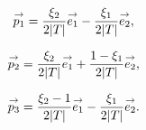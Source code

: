     \begin{minipage}{\textwidth}
      \begin{minipage}{0.329\textwidth}
          \begin{center}
            \begin{tikzpicture}[scale=1]
              
            \end{tikzpicture}
          \end{center}
          \begin{equation*}
            \vect{p_1}=\frac{\xi_2}{2|T|}\vect{e_1}-\frac{\xi_1}{2|T|}\vect{e_2},
          \end{equation*}
      \end{minipage}
      \begin{minipage}{0.329\textwidth}
          \begin{center}
            \begin{tikzpicture}[scale=1]
              
            \end{tikzpicture}
             \begin{equation*}
              \vect{p_2}= \frac{\xi_2}{2|T|}\vect{e_1} + \frac{1-\xi_1}{2|T|}\vect{e_2},
            \end{equation*}
          \end{center}
      \end{minipage}
      \begin{minipage}{0.329\textwidth}
          \begin{center}
            \begin{tikzpicture}[scale=1]
              
            \end{tikzpicture}
            \begin{equation*}
              \vect{p_3}= \frac{\xi_2-1}{2|T|}\vect{e_1} - \frac{\xi_1}{2|T|}\vect{e_2}.
            \end{equation*}
          \end{center}
      \end{minipage}
      \label{fig:form_int:fon_base:p}
    \end{minipage}

